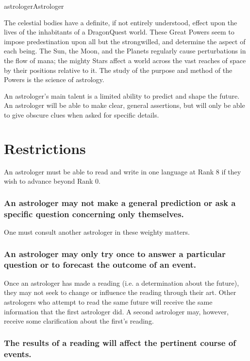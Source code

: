 \begin{Skill}{astrologer}{Astrologer}

The celestial bodies have a definite, if not entirely understood,
effect upon the lives of the inhabitants of a DragonQuest world. These
Great Powers seem to impose predestination upon all but the
strongwilled, and determine the aspect of each being. The Sun, the
Moon, and the Planets regularly cause perturbations in the flow of
mana; the mighty Stars affect a world across the vast reaches of space
by their positions relative to it.  The study of the purpose and
method of the Powers is the science of astrology.

An astrologer’s main talent is a limited ability to predict and shape
the future. An astrologer will be able to make clear, general
assertions, but will only be able to give obscure clues when asked for
specific details.

\section{Restrictions}

An astrologer must be able to read and write in one language at Rank 8
if they wish to advance beyond Rank 0.

\subsubsection{An astrologer may not make a general prediction or ask a specific
question concerning only themselves.}

One must consult another astrologer in these weighty matters.

\subsubsection{An astrologer may only try once to answer a particular question or to
forecast the outcome of an event.}

Once an astrologer has made a reading (i.e. a determination about the
future), they may not seek to change or influence the reading through
their art.  Other astrologers who attempt to read the same future will
receive the same information that the first astrologer did. A second
astrologer may, however, receive some clarification about the
first’s reading.

\subsubsection{The results of a reading will affect the pertinent course of events.}


\end{Skill}
